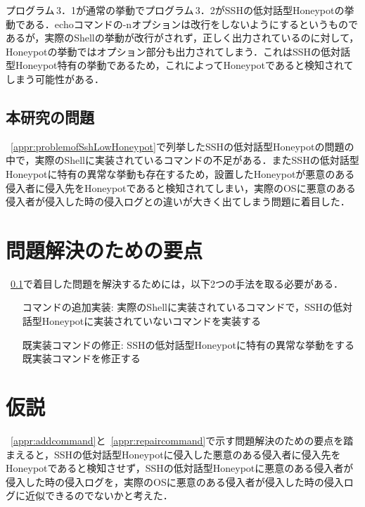 プログラム\,3．1が通常の挙動でプログラム\,3．2がSSHの低対話型Honeypotの挙動である．echoコマンドの-nオプションは改行をしないようにするというものであるが，実際のShellの挙動が改行がされず，正しく出力されているのに対して，Honeypotの挙動ではオプション部分も出力されてしまう．これはSSHの低対話型Honeypot特有の挙動であるため，これによってHoneypotであると検知されてしまう可能性がある．


\subsection{本研究の問題}
\label{appr:subproblem}
~\ref{appr:problemofSshLowHoneypot}で列挙したSSHの低対話型Honeypotの問題の中で，実際のShellに実装されているコマンドの不足がある．またSSHの低対話型Honeypotに特有の異常な挙動も存在するため，設置したHoneypotが悪意のある侵入者に侵入先をHoneypotであると検知されてしまい，実際のOSに悪意のある侵入者が侵入した時の侵入ログとの違いが大きく出てしまう問題に着目した．

\section{問題解決のための要点}
\label{appr:YotenForProblem}
~\ref{appr:subproblem}で着目した問題を解決するためには，以下2つの手法を取る必要がある．

\begin{itemize}
\setlength{\leftskip}{3.2cm}
 \item[コマンドの追加実装:] 実際のShellに実装されているコマンドで，SSHの低対話型Honeypotに実装されていないコマンドを実装する
 \item[既実装コマンドの修正:] SSHの低対話型Honeypotに特有の異常な挙動をする既実装コマンドを修正する
\end{itemize}


\section{仮説}
\label{appr:Hypothesis}
~\ref{appr:addcommand}と~\ref{appr:repaircommand}で示す問題解決のための要点を踏まえると，SSHの低対話型Honeypotに侵入した悪意のある侵入者に侵入先をHoneypotであると検知させず，SSHの低対話型Honeypotに悪意のある侵入者が侵入した時の侵入ログを，実際のOSに悪意のある侵入者が侵入した時の侵入ログに近似できるのでないかと考えた．

